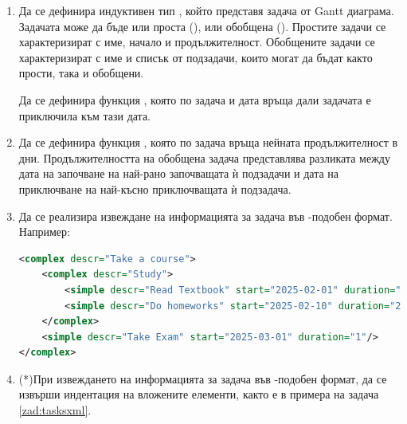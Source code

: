 \begin{enumerate}[resume]
	\item Да се дефинира индуктивен тип , който представя задача от Gantt диаграма. Задачата може да бъде или проста (), или обобщена (). Простите задачи се характеризират с име, начало и продължителност. Обобщените задачи се характеризират с име и списък от подзадачи, които могат да бъдат както прости, така и обобщени. 
	
	Да се дефинира функция , която по задача и дата връща дали задачата е приключила към тази дата. 

	\item Да се дефинира функция , която по задача връща нейната продължителност в дни. Продължителността на обобщена задача представлява разликата между дата на започване на най-рано започващата ѝ подзадачи и дата на приключване на най-късно приключващата ѝ подзадача. 
	
	\item \label{zad:tasksxml} Да се реализира извеждане на информацията за задача във -подобен формат. Например:
\begin{lstlisting}[basicstyle=\tiny,language=xml]
<complex descr="Take a course">
	<complex descr="Study">
		<simple descr="Read Textbook" start="2025-02-01" duration="20"/>
		<simple descr="Do homeworks" start="2025-02-10" duration="20"/>
	</complex>
	<simple descr="Take Exam" start="2025-03-01" duration="1"/>
</complex>
\end{lstlisting}

	\item(*)При извеждането на информацията за задача във -подобен формат, да се извърши индентация на вложените елементи, както е в примера на задача \ref{zad:tasksxml}.
	

\end{enumerate}
